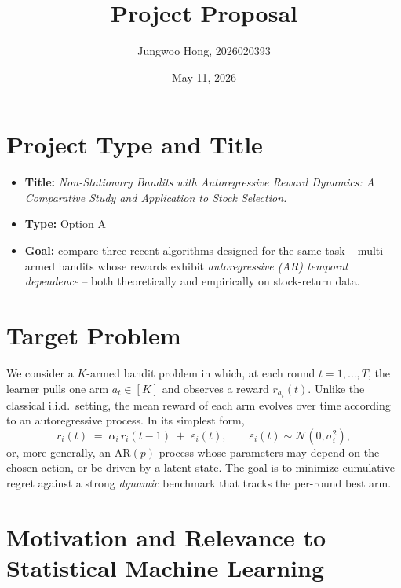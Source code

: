 \documentclass[11pt]{article}
\title{\vspace{-2em}\textbf{Project Proposal}}
\author{Jungwoo Hong, 2026020393}
\date{May 11, 2026}
\begin{document}
\maketitle

\section{Project Type and Title}

\begin{itemize}
  \item \textbf{Title:} \emph{Non-Stationary Bandits with Autoregressive Reward Dynamics: A Comparative Study and Application to Stock Selection.}
  \item \textbf{Type:} Option A
  \item \textbf{Goal:} compare three recent algorithms designed for the same task -- multi-armed bandits whose rewards exhibit \emph{autoregressive (AR) temporal dependence} -- both theoretically and empirically on stock-return data.
\end{itemize}

\section{Target Problem}

We consider a $K$-armed bandit problem in which, at each round $t = 1, \dots, T$, the learner pulls one arm $a_t \in [K]$ and observes a reward $r_{a_t}(t)$. Unlike the classical i.i.d.\ setting, the mean reward of each arm evolves over time according to an autoregressive process. In its simplest form,
\[
  r_i(t) \;=\; \alpha_i\, r_i(t-1) \;+\; \varepsilon_i(t),
  \qquad \varepsilon_i(t) \sim \mathcal{N}(0,\sigma_i^2),
\]
or, more generally, an AR$(p)$ process whose parameters may depend on the chosen action, or be driven by a latent state. The goal is to minimize cumulative regret against a strong \emph{dynamic} benchmark that tracks the per-round best arm.

\section{Motivation and Relevance to Statistical Machine Learning}
 
\end{document}
